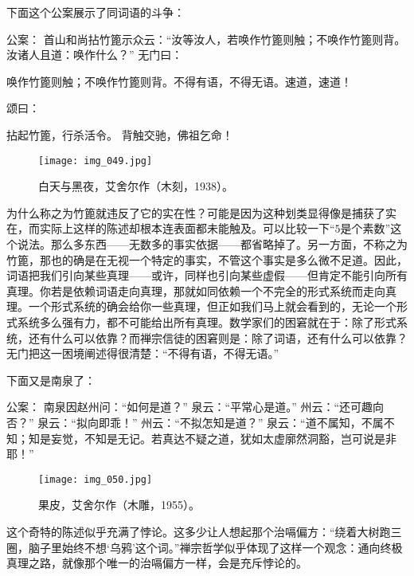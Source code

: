 下面这个公案展示了同词语的斗争：

\begin{zenkoan}
公案：
首山和尚拈竹篦示众云：“汝等汝人，若唤作竹篦则触；不唤作竹篦则背。汝诸人且道：唤作什么？”
无门曰：
\begin{zenkoan}
唤作竹篦则触；不唤作竹篦则背。不得有语，不得无语。速道，速道！
\end{zenkoan}
颂曰：
\begin{zenkoan}
拈起竹篦，行杀活令。
背触交驰，佛祖乞命！
\end{zenkoan}
\end{zenkoan}

\begin{figure}
\texttt{[image: img\_049.jpg]}
\caption[白天与黑夜，艾舍尔作。]
  {白天与黑夜，艾舍尔作（木刻，1938）。}
\end{figure}

为什么称之为竹篦就违反了它的实在性？可能是因为这种划类显得像是捕获了实在，而实际上这样的陈述却根本连表面都未能触及。可以比较一下“$5$是个素数”这个说法。那么多东西——无数多的事实依据——都省略掉了。另一方面，不称之为竹篦，那也的确是在无视一个特定的事实，不管这个事实是多么微不足道。因此，词语把我们引向某些真理——或许，同样也引向某些虚假——但肯定不能引向所有真理。你若是依赖词语走向真理，那就如同依赖一个不完全的形式系统而走向真理。一个形式系统的确会给你一些真理，但正如我们马上就会看到的，无论一个形式系统多么强有力，都不可能给出所有真理。数学家们的困窘就在于：除了形式系统，还有什么可以依靠？而禅宗信徒的困窘则是：除了词语，还有什么可以依靠？无门把这一困境阐述得很清楚：“不得有语，不得无语。”

下面又是南泉了：

\begin{zenkoan}
公案：
南泉因赵州问：“如何是道？”
泉云：“平常心是道。”
州云：“还可趣向否？”
泉云：“拟向即乖！”
州云：“不拟怎知是道？”
泉云：“道不属知，不属不知；知是妄觉，不知是无记。若真达不疑之道，犹如太虚廓然洞豁，岂可说是非耶！”\lnote{[见\fig{50}]}
\end{zenkoan}

\begin{figure}
\texttt{[image: img\_050.jpg]}
\caption[果皮，艾舍尔作。]
  {果皮，艾舍尔作（木雕，1955）。}
\end{figure}

这个奇特的陈述似乎充满了悖论。这多少让人想起那个治嗝偏方：“绕着大树跑三圈，脑子里始终不想‘乌鸦’这个词。”禅宗哲学似乎体现了这样一个观念：通向终极真理之路，就像那个唯一的治嗝偏方一样，会是充斥悖论的。

